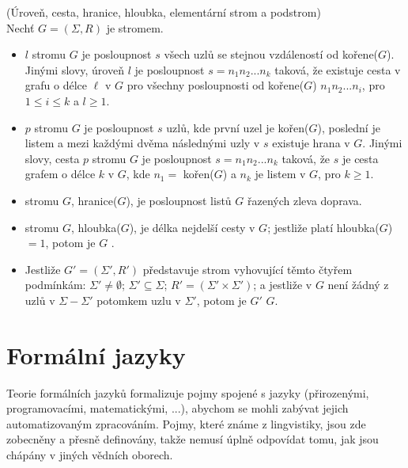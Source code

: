 \begin{defn}
  (Úroveň, cesta, hranice, hloubka, elementární strom a podstrom)\\
  Nechť $G = (\Sigma, R)$ je stromem.
  \begin{itemize}
    \item {} $l$ stromu $G$ je posloupnost $s$
      všech uzlů se stejnou vzdáleností od kořene($G$).
      Jinými slovy, úroveň $l$ je posloupnost $s = n_1 n_2 ... n_k$
      taková, že existuje cesta v grafu o délce $\ell$ v $G$
      pro všechny posloupnosti od kořene($G$)
      $ n_1n_2 ... n_i$, pro $1 \leq i \leq k$ a $l \geq 1$.

    \item {} $p$ stromu $G$ je posloupnost $s$ uzlů,
      kde první uzel je kořen($G$), poslední je listem a mezi každými
      dvěma následnými uzly v $s$ existuje hrana v $G$.
      Jinými slovy, cesta $p$ stromu $G$ je posloupnost
      $s = n_1 n_2 ... n_k$ taková, že $s$ je cesta grafem
      o délce $k$ v $G$, kde $n_1 =$ kořen($G$) a $n_k$ je listem
      v $G$, pro $k \geq 1$.

    \item {} stromu $G$, hranice($G$),
      je posloupnost listů $G$ řazených zleva doprava.

    \item {} stromu $G$, hloubka($G$), je délka nejdelší cesty v $G$;
      jestliže platí hloubka($G$)$ = 1$, potom je $G$ .

    \item Jestliže $G' = (\Sigma', R')$ představuje strom vyhovující těmto
      čtyřem podmínkám:
      $\Sigma' \neq \emptyset$;
      $\Sigma' \subseteq \Sigma$;
      $R' = (\Sigma' \times \Sigma')$;
      a jestliže v $G$ není žádný z uzlů v $\Sigma - \Sigma'$ potomkem
      uzlu v $\Sigma'$, potom je $G'$  $G$.
  \end{itemize}
  \vspace{-0.5cm}
\end{defn}

\chapter{Formální jazyky}
\label{chap:FormalLangs}

Teorie formálních jazyků formalizuje pojmy spojené s jazyky
(přirozenými, programovacími, matematickými, ...), abychom se mohli zabývat
jejich automatizovaným zpracováním.
Pojmy, které známe z lingvistiky, jsou zde zobecněny a přesně definovány,
takže nemusí úplně odpovídat tomu, jak jsou chápány v jiných vědních oborech.

